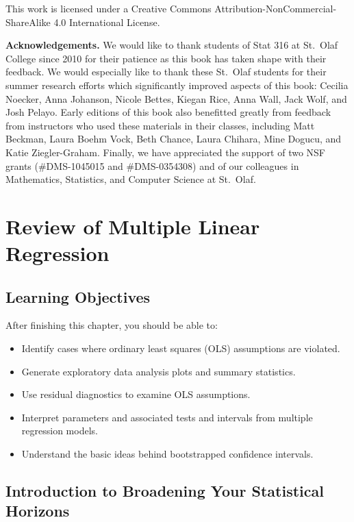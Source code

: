 \documentclass[
]{krantz}
\providecommand{\tightlist}{%
  \setlength{\itemsep}{0pt}\setlength{\parskip}{0pt}}
\begin{document}
This work is licensed under a Creative Commons Attribution-NonCommercial-ShareAlike 4.0 International License.

\textbf{Acknowledgements.} We would like to thank students of Stat 316 at St.~Olaf College since 2010 for their patience as this book has taken shape with their feedback. We would especially like to thank these St.~Olaf students for their summer research efforts which significantly improved aspects of this book: Cecilia Noecker, Anna Johanson, Nicole Bettes, Kiegan Rice, Anna Wall, Jack Wolf, and Josh Pelayo. Early editions of this book also benefitted greatly from feedback from instructors who used these materials in their classes, including Matt Beckman, Laura Boehm Vock, Beth Chance, Laura Chihara, Mine Dogucu, and Katie Ziegler-Graham. Finally, we have appreciated the support of two NSF grants (\#DMS-1045015 and \#DMS-0354308) and of our colleagues in Mathematics, Statistics, and Computer Science at St.~Olaf.

\hypertarget{ch-MLRreview}{%
\chapter{Review of Multiple Linear Regression}\label{ch-MLRreview}}

\hypertarget{learning-objectives}{%
\section{Learning Objectives}\label{learning-objectives}}

After finishing this chapter, you should be able to:

\begin{itemize}
\tightlist
\item
  Identify cases where ordinary least squares (OLS) assumptions are violated.
\item
  Generate exploratory data analysis plots and summary statistics.
\item
  Use residual diagnostics to examine OLS assumptions.
\item
  Interpret parameters and associated tests and intervals from multiple regression models.
\item
  Understand the basic ideas behind bootstrapped confidence intervals.
\end{itemize}

\hypertarget{introduction-to-broadening-your-statistical-horizons}{%
\section{Introduction to Broadening Your Statistical Horizons}\label{introduction-to-broadening-your-statistical-horizons}}
\end{document}
